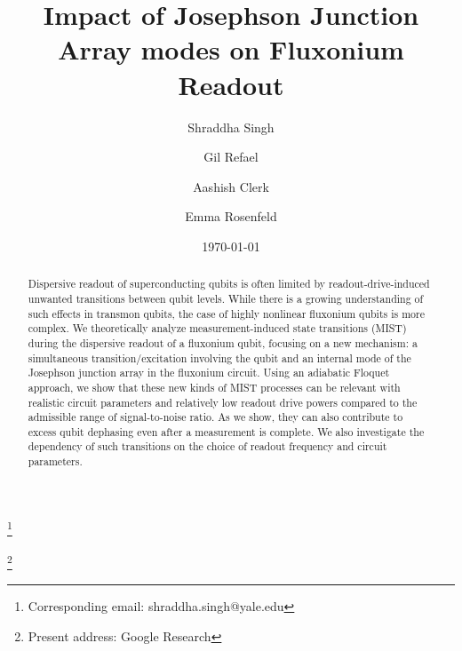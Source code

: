 \documentclass[%
reprint,
superscriptaddress,
 amsmath,amssymb,
 aps,
 prx,
longbibliography,
floatfix,
]{revtex4-2}
\begin{document}
\title{Impact of Josephson Junction Array modes on Fluxonium Readout}

\author{Shraddha Singh}\thanks{Corresponding email: shraddha.singh@yale.edu}
\author{Gil Refael}
\author{Aashish Clerk}
\author{Emma Rosenfeld}\thanks{Present address: Google Research}
\date{\today}%

\begin{abstract}
Dispersive readout of superconducting qubits is often limited by %
readout-drive-induced unwanted transitions between qubit levels. While there is a growing understanding of such effects in transmon qubits, the case of highly nonlinear fluxonium qubits is more complex.  We theoretically analyze measurement-induced state transitions (MIST) during the dispersive readout of a fluxonium qubit, focusing on a new mechanism: a simultaneous transition/excitation involving the qubit and an internal mode of the Josephson junction array in the fluxonium circuit. %
Using an adiabatic Floquet approach, we show that these new kinds of MIST processes 
can be relevant with realistic circuit parameters and relatively low readout drive powers compared to the admissible range of signal-to-noise ratio.  As we show, they can also contribute to excess qubit dephasing even after a measurement is complete. We also investigate the dependency of such transitions on the choice of readout frequency and circuit parameters.
\end{abstract}
\end{document}
